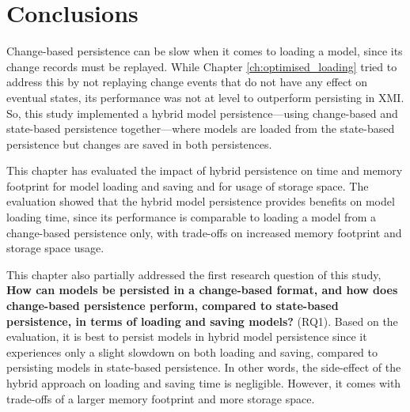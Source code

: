 \section{Conclusions}
\label{sec:conclusions_5}
Change-based persistence can be slow when it comes to loading a model, since its change records must be replayed. While Chapter \ref{ch:optimised_loading} tried to address this by not replaying change events that do not have any effect on eventual states, its performance was not at level to outperform persisting in XMI. So, this study implemented a hybrid model persistence—using change-based and state-based persistence together—where models are loaded from the state-based persistence but changes are saved in both persistences.

This chapter has evaluated the impact of hybrid persistence on time and memory footprint for model loading and saving and for usage of storage space. The evaluation showed that the hybrid model persistence provides benefits on model loading time, since its performance is comparable to loading a model from a change-based persistence only, with trade-offs on increased memory footprint and storage space usage.

This chapter also partially addressed the first research question of this study, \textbf{How can models be persisted in a change-based format, and how does change-based persistence perform, compared to state-based persistence, in terms of loading and saving models?} (RQ1). Based on the evaluation, it is best to persist models in hybrid model persistence since it experiences only a slight slowdown on both loading and saving, compared to persisting models in state-based persistence. In other words, the side-effect of the hybrid approach on loading and saving time is negligible. However, it comes with trade-offs of a larger memory footprint and more storage space.


